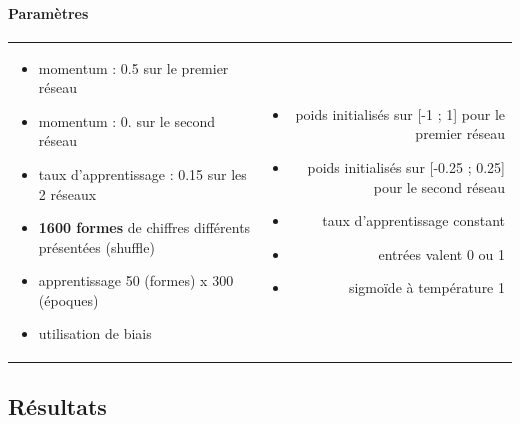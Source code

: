     \paragraph{Paramètres}
      \begin{center}
	\begin{tabular}{lr}
	  \begin{minipage}{230px}
	    \begin{itemize}
	      \item momentum : 0.5 sur le premier réseau
	      \item momentum : 0. sur le second réseau
	      \item taux d'apprentissage : 0.15 sur les 2 réseaux
	      \item \textbf{1600 formes} de chiffres différents présentées (shuffle) \cite{Handwritten_256}
	      \item apprentissage 50 (formes) x 300 (époques)
	      \item utilisation de biais
	      
	    \end{itemize}
	  \end{minipage}
	  &
	  \begin{minipage}{230px}
	    \begin{itemize}
	      \item poids initialisés sur [-1 ; 1] pour le premier réseau
	      \item poids initialisés sur [-0.25 ; 0.25] pour le second réseau
	      \item taux d'apprentissage constant
	      \item entrées valent 0 ou 1
	      \item sigmoïde à température 1
	    \end{itemize}
	  \end{minipage}
	\end{tabular}
      \end{center}

  
  \newpage
  \subsection{Résultats}
